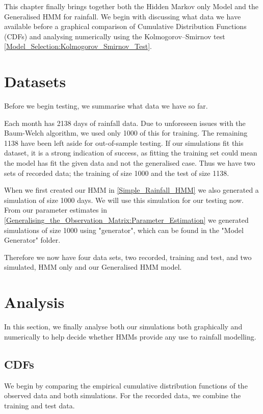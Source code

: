 
This chapter finally brings together both the Hidden Markov only Model and the Generalised HMM for rainfall. We begin with discussing what data we have available before a graphical comparison of Cumulative Distribution Functions (CDFs) and analysing numerically using the Kolmogorov–Smirnov test \ref{Model_Selection:Kolmogorov_Smirnov_Test}.

\section{Datasets}
\label{Results:Datasets}
Before we begin testing, we summarise what data we have so far. 

Each month has 2138 days of rainfall data. Due to unforeseen issues with the Baum-Welch algorithm, we used only 1000 of this for training. The remaining 1138 have been left aside for out-of-sample testing. If our simulations fit this dataset, it is a strong indication of success, as fitting the training set could mean the model has fit the given data and not the generalised case. Thus we have two sets of recorded data; the training of size 1000 and the test of size 1138.

When we first created our HMM in \ref{Simple_Rainfall_HMM} we also generated a simulation of size 1000 days. We will use this simulation for our testing now. From our parameter estimates in \ref{Generalising_the_Observation_Matrix:Parameter_Estimation} we generated simulations of size 1000 using "generator", which can be found in the "Model Generator" folder. 

Therefore we now have four data sets, two recorded, training and test,  and two simulated, HMM only and our Generalised HMM model.


\section{Analysis}
\label{Results:Analysis}

In this section, we finally analyse both our simulations both graphically and numerically to help decide whether HMMs provide any use to rainfall modelling.

    \subsection{CDFs}
    \label{Results:Analysis:CDFs}
    We begin by comparing the empirical cumulative distribution functions of the observed data and both simulations. For the recorded data, we combine the training and test data.


